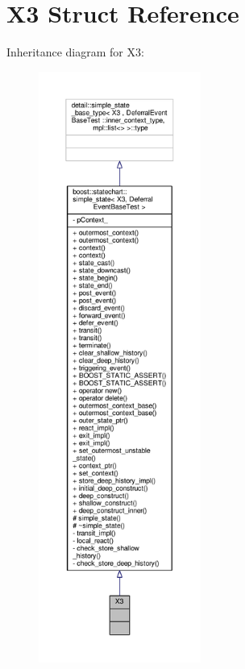 \hypertarget{struct_x3}{}\section{X3 Struct Reference}
\label{struct_x3}


Inheritance diagram for X3\+:
\nopagebreak
\begin{figure}[H]
\begin{center}
\leavevmode
\includegraphics[height=550pt]{struct_x3__inherit__graph}
\end{center}
\end{figure}


